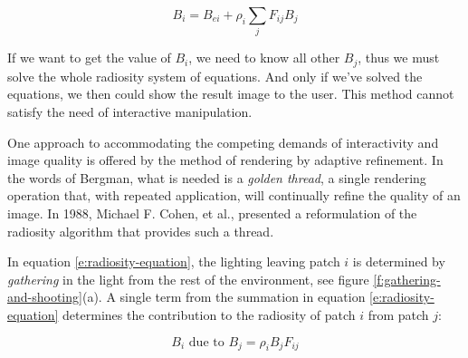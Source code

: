 \begin{equation}\label{e:radiosity-equation}
	B_i=B_{ei}+\rho_i \sum_j F_{ij} B_j
\end{equation}

If we want to get the value of $B_i$, we need to know all other $B_j$, thus we must solve the whole radiosity system of equations. And only if we've solved the equations, we then could show the result image to the user. This method cannot satisfy the need of interactive manipulation. 

One approach to accommodating the competing demands of interactivity and image quality is offered by the method of rendering by adaptive refinement\cite[-5mm]{a:ImageRenderingbyAdaptiveRefinement}. In the words of Bergman, what is needed is a \textit{golden thread}, a single rendering operation that, with repeated application, will continually refine the quality of an image. In 1988, Michael F. Cohen, et al., presented\cite{a:AProgressiveRefinementApproachtoFastRadiosityImageGeneration} a reformulation of the radiosity algorithm that provides such a thread.

In equation \ref{e:radiosity-equation}, the lighting leaving patch $i$ is determined by \textit{gathering} in the light from the rest of the environment, see figure \ref{f:gathering-and-shooting}(a). A single term from the summation in equation \ref{e:radiosity-equation} determines the contribution to the radiosity of patch $i$ from patch $j$:

\begin{equation*}
	B_i \text{ due to }B_j=\rho_i B_j F_{ij}
\end{equation*}


